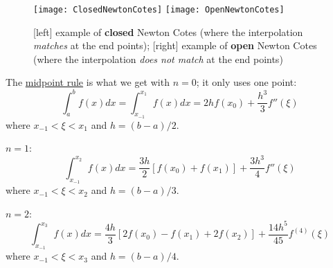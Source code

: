 \documentclass[12pt]{article}
\begin{document}
\begin{figure}
\begin{center}
  \texttt{[image: ClosedNewtonCotes]}
  \texttt{[image: OpenNewtonCotes]}
\end{center}
\caption{[left] example of \textbf{closed} Newton Cotes (where the interpolation \textit{matches} at the end points); [right] example of \textbf{open} Newton Cotes (where the interpolation \textit{does not match} at the end points)}
\end{figure}


\vspace*{1 em}
The \underline{midpoint rule} is what we get with \underline{$n=0$}; it only uses one point:
\[\int_a^b f(x)dx = \int_{x_{-1}}^{x_{1}} f(x)dx = 2hf(x_0) + \frac{h^3}{3}f''(\xi)\]
where $x_{-1} < \xi < x_{1}$ and $h=(b-a)/2$.

\underline{$n=1$}:
\[ \int_{x_{-1}}^{x_{2}} f(x)dx = \frac{3h}{2}[f(x_0) + f(x_1)] + \frac{3h^3}{4}f''(\xi)\]
where $x_{-1} < \xi < x_{2}$ and $h=(b-a)/3$.

\underline{$n=2$}:
\[ \int_{x_{-1}}^{x_{3}} f(x)dx = \frac{4h}{3}[2f(x_0) - f(x_1) + 2f(x_2)] + \frac{14h^5}{45}f^{(4)}(\xi)\]
where $x_{-1} < \xi < x_{3}$ and $h=(b-a)/4$.




%
% 
\end{document}
